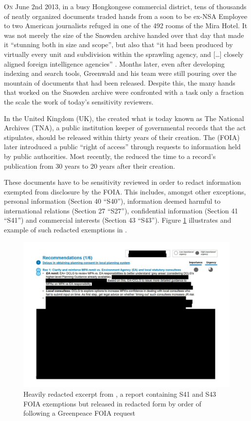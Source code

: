 \documentclass[\version]{l4proj}
\begin{document}
\lettrine[lines=3,nindent=0em]{O}{n} June 2nd 2013, in a busy Hongkongese commercial district, tens of thousands of neatly organized documents traded hands from a soon to be ex-NSA Employee to two American journalists refuged in one of the 492 rooms of the Mira Hotel.
It was not merely the size of the Snowden archive handed over that day that made it ``stunning both in size and scope'', but also that ``it had been produced by virtually every unit and subdivision within the sprawling agency, and [\ldots] closely aligned foreign intelligence agencies'' \autocite[77]{greenwaldNoPlaceHide2014}.
Months later, even after developing indexing and search tools, Greenwald and his team were still pouring over the mountain of documents that had been released.
Despite this, the many hands that worked on the Snowden archive were confronted with a task only a fraction the scale the work of today's sensitivity reviewers.

In the United Kingdom (UK), the \textcite{PublicRecordsAct1958} created what is today known as The National Archives (TNA), a public institution keeper of governmental records that the act stipulates, should be released within thirty years of their creation.
The \textcite{FreedomInformationAct2000} (FOIA) later introduced a public ``right of access'' through requests to information held by public authorities.
Most recently, the \textcite{ConstitutionalReformGovernance2010} reduced the time to a record's publication from 30 years to 20 years after their creation.

These documents have to be sensitivity reviewed in order to redact information exempted from disclosure by the FOIA.
This includes, amongst other exceptions, personal information (Section 40 ``S40''), information deemed harmful to international relations (Section 27 ``S27''), confidential information (Section 41 ``S41'') and commercial interests (Section 43 ``S43'').
Figure \ref{fig:fracking_report} illustrates and example of such redacted exemptions in \textcite{StateUKShale2016}.

\begin{figure}[H]
    \centering
    \includegraphics[width=0.6\linewidth]{figures/fracking_report_22.pdf}
    \caption{Heavily redacted excerpt from \textcite[22]{StateUKShale2016}, a report containing S41 and S43 FOIA exemptions but released in redacted form by order of \textcite{judgeshanksCabinetOfficeICO2018} following a Greenpeace FOIA request}\label{fig:fracking_report}
\end{figure}
\end{document}
